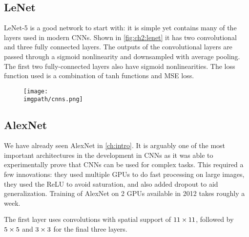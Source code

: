 \subsection{LeNet}
LeNet-5 \cite{lecun_gradient-based_1998} is a good network to start with: it
is simple yet contains many of the layers used in modern CNNs. Shown in
\autoref{fig:ch2:lenet} it has two convolutional and three fully connected
layers. The outputs of the convolutional layers are passed through a sigmoid
nonlinearity and downsampled with average pooling. The first two fully-connected
layers also have sigmoid nonlinearities. The loss function used is a combination
of tanh functions and MSE loss.

\begin{figure}
  \centering
  \texttt{[image: \\imgpath/cnns.png]}
  \label{fig:ch2:lenet}
\end{figure}

\subsection{AlexNet}
We have already seen AlexNet \cite{krizhevsky_imagenet_2012} in \autoref{ch:intro}. 
It is arguably one of the most important architectures in the development in CNNs as it 
was able to experimentally prove that CNNs can be used for complex tasks. This
required a few innovations: they used multiple GPUs to do fast
processing on large images, they used the ReLU to avoid saturation, and also added dropout
to aid generalization. Training of AlexNet on 2 GPUs available in 2012 takes
roughly a week.

The first layer uses convolutions with spatial support of $11\times11$, followed
by $5\times 5$ and $3\times 3$ for the final three layers.


